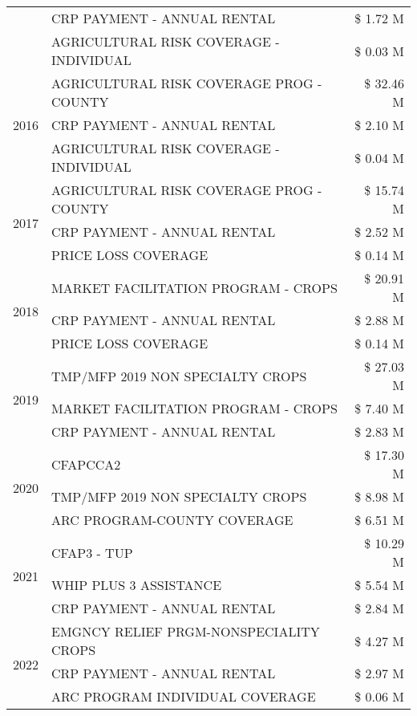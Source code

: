 \begin{tabular}{llr}
 & CRP PAYMENT - ANNUAL RENTAL & \$ 1.72 M \\
 & AGRICULTURAL RISK COVERAGE - INDIVIDUAL & \$ 0.03 M \\
\cline{1-3}
\multirow[t]{3}{*}{2016} & AGRICULTURAL RISK COVERAGE PROG - COUNTY & \$ 32.46 M \\
 & CRP PAYMENT - ANNUAL RENTAL & \$ 2.10 M \\
 & AGRICULTURAL RISK COVERAGE - INDIVIDUAL & \$ 0.04 M \\
\cline{1-3}
\multirow[t]{3}{*}{2017} & AGRICULTURAL RISK COVERAGE PROG - COUNTY & \$ 15.74 M \\
 & CRP PAYMENT - ANNUAL RENTAL & \$ 2.52 M \\
 & PRICE LOSS COVERAGE & \$ 0.14 M \\
\cline{1-3}
\multirow[t]{3}{*}{2018} & MARKET FACILITATION PROGRAM - CROPS & \$ 20.91 M \\
 & CRP PAYMENT - ANNUAL RENTAL & \$ 2.88 M \\
 & PRICE LOSS COVERAGE & \$ 0.14 M \\
\cline{1-3}
\multirow[t]{3}{*}{2019} & TMP/MFP 2019 NON SPECIALTY CROPS & \$ 27.03 M \\
 & MARKET FACILITATION PROGRAM - CROPS & \$ 7.40 M \\
 & CRP PAYMENT - ANNUAL RENTAL & \$ 2.83 M \\
\cline{1-3}
\multirow[t]{3}{*}{2020} & CFAPCCA2 & \$ 17.30 M \\
 & TMP/MFP 2019 NON SPECIALTY CROPS & \$ 8.98 M \\
 & ARC PROGRAM-COUNTY COVERAGE & \$ 6.51 M \\
\cline{1-3}
\multirow[t]{3}{*}{2021} & CFAP3 - TUP & \$ 10.29 M \\
 & WHIP PLUS 3 ASSISTANCE & \$ 5.54 M \\
 & CRP PAYMENT - ANNUAL RENTAL & \$ 2.84 M \\
\cline{1-3}
\multirow[t]{3}{*}{2022} & EMGNCY RELIEF PRGM-NONSPECIALITY CROPS & \$ 4.27 M \\
 & CRP PAYMENT - ANNUAL RENTAL & \$ 2.97 M \\
 & ARC PROGRAM INDIVIDUAL COVERAGE & \$ 0.06 M \\
\cline{1-3}
\bottomrule
\end{tabular}
